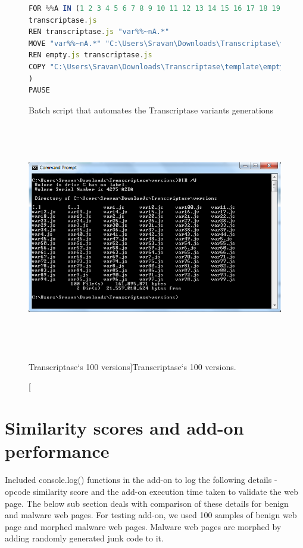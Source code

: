 \begin{figure}[h]
  \centering
\begin{lstlisting}[frame=single,language=JavaScript,mathescape=false,morekeywords={REN, MOVE, IN, COPY, PAUSE, FOR, DO}]
FOR %%A IN (1 2 3 4 5 6 7 8 9 10 11 12 13 14 15 16 17 18 19 20 21 22 23 24 25 26 27 28 29 30 31 32 33 34 35 36 37 38 39 40 41 42 43 44 45 46 47 48 49 50 51 52 53 54 55 56 57 58 59 60 61 62 63 64 65 66 67 68 69 70 71 72 73 74 75 76 77 78 79 80 81 82 83 84 85 86 87 88 89 90 91 92 93 94 95 96 97 98 99 100) DO (
transcriptase.js
REN transcriptase.js "var%%~nA.*"
MOVE "var%%~nA.*" "C:\Users\Sravan\Downloads\Transcriptase\versions"
REN empty.js transcriptase.js
COPY "C:\Users\Sravan\Downloads\Transcriptase\template\empty.js" .
)
PAUSE
\end{lstlisting}
\caption[Batch script]{Batch script that automates the Transcriptase variants generations}
    \label{fig:batchscriptcode}
\end{figure}

\begin{figure}[h]
  \centering
      \includegraphics[width=16.875cm, height=10cm]{Capture.PNG}
    \caption[Transcriptase`s 100 versions]{Transcriptase`s 100 versions.}
    \label{fig:100versions}
\end{figure}

\section{Similarity scores and add-on performance}
Included console.log() functions in the add-on to log the following details - opcode similarity score and the add-on execution time taken to validate the web page. The below sub section deals with comparison of these details for benign and malware web pages. For testing add-on, we used 100 samples of benign web page and morphed malware web pages. Malware web pages are morphed by adding randomly generated junk code to it.
